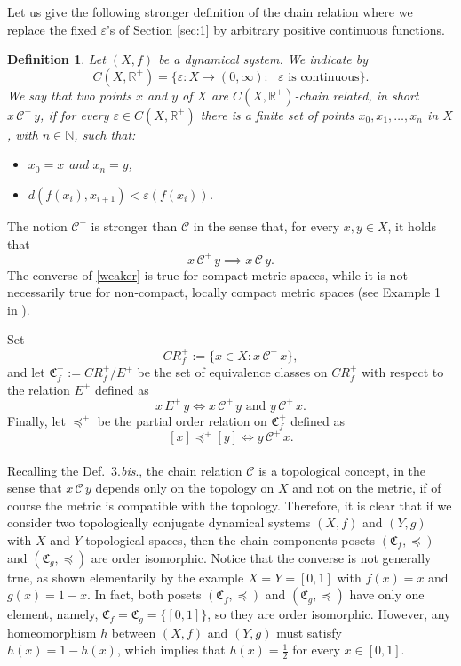 \documentclass[pdflatex,sn-mathphys-num]{sn-jnl}
\theoremstyle{thmstyleone}%
\theoremstyle{thmstyletwo}%
\theoremstyle{thmstylethree}%
\newtheorem{defi}{Definition}%
\begin{document}
\noindent Let us give the following stronger definition of the chain relation where we replace the fixed $\varepsilon$'s of Section \ref{sec:1} by arbitrary positive continuous functions. 
\begin{defi} 
Let $(X,f)$ be a dynamical system. We indicate by 
\[
C(X,\mathbb{R}^+)=\{\varepsilon:X\to(0,\infty):\text{ $\varepsilon$ is continuous}\}.
\]
We say that two points $x$ and $y$ of $X$ are ${C(X,\mathbb{R}^+)}$-{\em chain related}, in short $x\,\mathcal{C}^+\,y$, if for every $\varepsilon\in C(X,\mathbb{R}^+)$ there is a finite set of points $x_0,x_1,\ldots,x_n$ in $X$, with $n\in\mathbb{N}$, such that:
\begin{itemize}
\item $x_0=x$ and $x_n=y$,
\item $d(f(x_i),x_{i+1})<\varepsilon(f(x_i))$.
\end{itemize}
\end{defi}
\noindent The notion $\mathcal{C}^+$ is stronger than $\mathcal{C}$ in the sense that, for every $x,y\in X$, it holds that 
\begin{equation}\label{weaker}
x\,\mathcal{C}^+\,y \implies x\,\mathcal{C}\,y.
\end{equation}
The converse of \eqref{weaker} is true for compact metric spaces, while it is not necessarily true for non-compact, locally compact metric spaces (see Example 1 in \cite[p.~1141]{hu92}).

\noindent Set
$$
CR^+_f:=\{x\in X:x\,\mathcal{C}^+\,x\},
$$
and let $\mathfrak{C}^+_f:=CR^+_f/E^+$ be the set of equivalence classes on $CR^+_f$ with respect to the relation $E^+$ defined as
$$
x\, E^+\, y \iff x\,\mathcal{C}^+\, y \text{ and } y\,\mathcal{C}^+\, x.
$$
Finally, let $\preceq^+$ be the partial order relation on $\mathfrak{C}^+_f$ defined as
$$
[x]\preceq^+ [y] \iff y\,\mathcal{C}^+\, x.
$$
\\
Recalling the Def.~3.\textit{bis}., the chain relation $\mathcal{C}$ is a topological concept, in the sense that $x\,\mathcal{C}\,y$ depends only on the topology on $X$ and not on the metric, if of course the metric is compatible with the topology. 
Therefore, it is clear that if we consider two topologically conjugate dynamical systems $(X,f)$ and $(Y,g)$ with $X$ and $Y$ topological spaces, then the chain components posets $(\mathfrak{C}_f,\preceq)$ and $(\mathfrak{C}_g,\preceq)$ are order isomorphic.
Notice that the converse is not generally true, as shown elementarily by the example $X=Y=[0,1]$ with $f(x)=x$ and $g(x)=1-x$. 
In fact, both posets $(\mathfrak{C}_f,\preceq)$ and $(\mathfrak{C}_g,\preceq)$ have only one element, namely, $\mathfrak{C}_f=\mathfrak{C}_g=\{[0,1]\}$, so they are order isomorphic.
However, any homeomorphism $h$ between $(X,f)$ and $(Y,g)$ must satisfy $h(x)=1-h(x)$, which implies that $h(x)=\frac 1 2 $ for every $x\in [0,1]$. 
\end{document}
